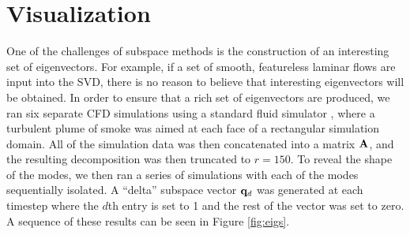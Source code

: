 \documentclass[11pt]{article}
\begin{document}
\section*{Visualization}

One of the challenges of subspace methods is the construction of an interesting set of eigenvectors. For example, if a set of smooth, featureless laminar flows are input into the SVD, there is no reason to believe that interesting eigenvectors will be obtained. In order to ensure that a rich set of eigenvectors are produced, we ran six separate CFD simulations using a standard fluid simulator \cite{Stam99}, where a turbulent plume of smoke was aimed at each face of a rectangular simulation domain. All of the simulation data was then concatenated into a matrix $\mathbf{A}$, and the resulting decomposition was then truncated to $r = 150$. To reveal the shape of the modes, we then ran a series of simulations with each of the modes sequentially isolated. A ``delta'' subspace vector $\mathbf{q}_d$ was generated at each timestep where the $d$th entry is set to 1 and the rest of the vector was set to zero. A sequence of these results can be seen in Figure \ref{fig:eigs}.
\end{document}
